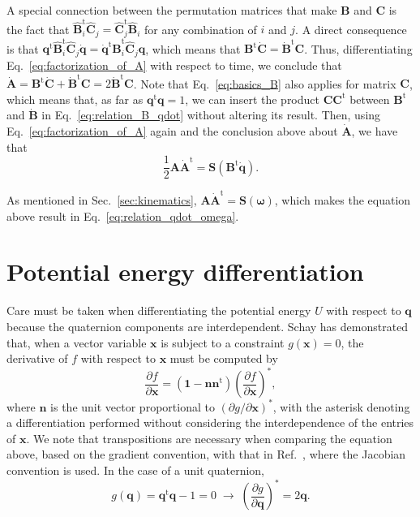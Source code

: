 \documentclass[aip,jcp,reprint,amsmath,amssymb]{revtex4-1}
\newcommand{\mt}[1]{\boldsymbol{\mathbf{#1}}}           %
\newcommand{\vt}[1]{\boldsymbol{\mathbf{#1}}}           %
\newcommand{\tr}[1]{#1^\text{t}}                        %
\newcommand{\diff}[2]{\dfrac{\partial #1}{\partial #2}} %
\begin{document}
A special connection between the permutation matrices that make $\mt B$ and $\mt C$ is the fact that $\tr{\hat{\mt B}_i}{\hat{\mt C}_j} = \tr{\hat{\mt C}_j}{\hat{\mt B}_i}$ for any combination of $i$ and $j$. A direct consequence is that $\tr{\vt q}\tr{\hat{\mt B}}_i\hat{\mt C}_j\dot{\vt q} = \tr{\dot{\vt q}}\tr{\hat{\mt B}}_i\hat{\mt C}_j{\vt q}$, which means that $\tr{\mt B}\dot{\mt C} = \tr{\dot{\mt B}}{\mt C}$. Thus, differentiating Eq.~\ref{eq:factorization_of_A} with respect to time, we conclude that $\dot{\mt A} = \tr{\mt B}\dot{\mt C} + \tr{\dot{\mt B}}{\mt C} = 2 \tr{\dot{\mt B}}{\mt C}$. Note that Eq.~\ref{eq:basics_B} also applies for matrix $\mt C$, which means that, as far as $\tr{\vt q}\vt q = 1$, we can insert the product $\mt C\tr{\mt C}$ between $\tr{\mt B}$ and $\dot{\mt B}$ in Eq.~\ref{eq:relation_B_qdot} without altering its result. Then, using Eq.~\ref{eq:factorization_of_A} again and the conclusion above about $\dot{\mt A}$, we have that
\begin{equation}
\frac{1}{2} {\mt A}\tr{\dot{\mt A}} = {\mt S}\left( \tr{\mt B}\dot{\vt q} \right).
\end{equation}

As mentioned in Sec.~\ref{sec:kinematics}, ${\mt A}\tr{\dot{\mt A}} = \mt S(\vt \omega)$, which makes the equation above result in Eq.~\ref{eq:relation_qdot_omega}.

\section{Potential energy differentiation}
\label{sec:Diff_PotEng}

Care must be taken when differentiating the potential energy $U$ with respect to $\vt q$ because the quaternion components are interdependent. Schay has demonstrated that, when a vector variable $\vt x$ is subject to a constraint $g(\vt x) = 0$, the derivative of $f$ with respect to $\vt x$ must be computed by\cite{Schay1995}
\[
\diff{f}{\vt x} = (\vt 1 - \vt n \tr{\vt n})\left( \diff{f}{\vt x} \right)^\ast,
\]
where $\vt n$ is the unit vector proportional to $(\partial g/\partial \vt x)^\ast$, with the asterisk denoting a differentiation performed without considering the interdependence of the entries of $\vt x$. We note that transpositions are necessary when comparing the equation above, based on the gradient convention, with that in Ref.~, where the Jacobian convention is used. In the case of a unit quaternion,
\[
g(\vt q) = \tr{\vt q}\vt q - 1 = 0 \; \rightarrow \; \left(\diff{g}{\vt q}\right)^\ast = 2 \vt q.
\]
\end{document}
